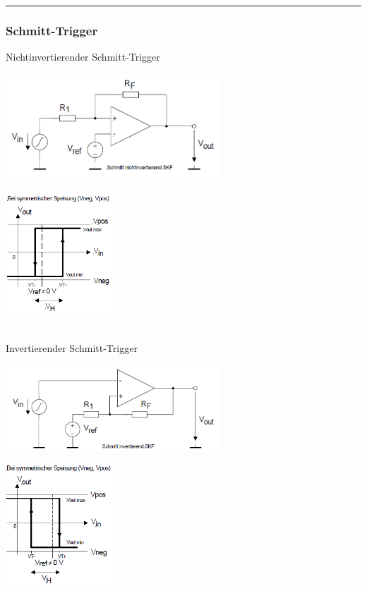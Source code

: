 \hrule
		
		\subsubsection{Schmitt-Trigger }
		Nichtinvertierender Schmitt-Trigger\\
			\begin{minipage}{9cm}
	          	\includegraphics[width=8cm]{./bilder/n-schmitt.png} 
	        \end{minipage}
			\begin{minipage}{9cm}
	          	\includegraphics[width=4cm]{./bilder/n-schmitt-kennlinie.png} 
	        \end{minipage}\\
		Invertierender Schmitt-Trigger\\
			\begin{minipage}{9cm}
	          	\includegraphics[width=8cm]{./bilder/i-schmitt.png} 
	        \end{minipage}
			\begin{minipage}{9cm}
	          	\includegraphics[width=4cm]{./bilder/i-schmitt-kennlinie.png} 
	        \end{minipage}\\
			
